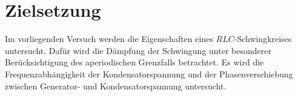 
\section{Zielsetzung}
\label{sec:Zielsetzung}

Im vorliegenden Versuch werden die Eigenschaften eines $RLC$-Schwingkreises untersucht. Dafür wird die Dämpfung der Schwingung unter besonderer Berücksichtigung des aperiodischen Grenzfalls betrachtet. Es wird die Frequenzabhängigkeit der Kondensatorspannung und der Phasenverschiebung zwischen Generator- und Kondensatorspannung untersucht.
